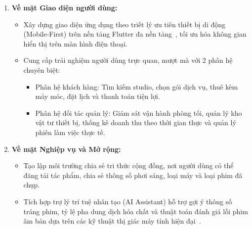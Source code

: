 \begin{enumerate}[leftmargin=2em]
    \item \textbf{Về mặt Giao diện người dùng:}
    \begin{itemize}
        \item Xây dựng giao diện ứng dụng theo triết lý ưu tiên thiết bị di động (Mobile-First) trên nền tảng Flutter đa nền tảng~\cite{alzewairi2024critical}, tối ưu hóa không gian hiển thị trên màn hình điện thoại.
        \item Cung cấp trải nghiệm người dùng trực quan, mượt mà với 2 phân hệ chuyên biệt:
        \begin{itemize}
            \item Phân hệ khách hàng: Tìm kiếm studio, chọn gói dịch vụ, thuê kèm máy móc, đặt lịch và thanh toán tiện lợi.
            \item Phân hệ đối tác quản lý: Giám sát vận hành phòng tối, quản lý kho vật tư thiết bị, thống kê doanh thu theo thời gian thực và quản lý phiên làm việc thực tế.
        \end{itemize}
    \end{itemize}

    \item \textbf{Về mặt Nghiệp vụ và Mở rộng:}
    \begin{itemize}
        \item Tạo lập môi trường chia sẻ tri thức cộng đồng, nơi người dùng có thể đăng tải tác phẩm, chia sẻ thông số phơi sáng, loại máy và loại phim đã chụp.
        \item Tích hợp trợ lý trí tuệ nhân tạo (AI Assistant) hỗ trợ gợi ý thông số tráng phim, tỷ lệ pha dung dịch hóa chất và thuật toán đánh giá lỗi phim âm bản dựa trên các kỹ thuật thị giác máy tính hiện đại~\cite{wan2023old, rombach2022high}.
    \end{itemize}
\end{enumerate}
